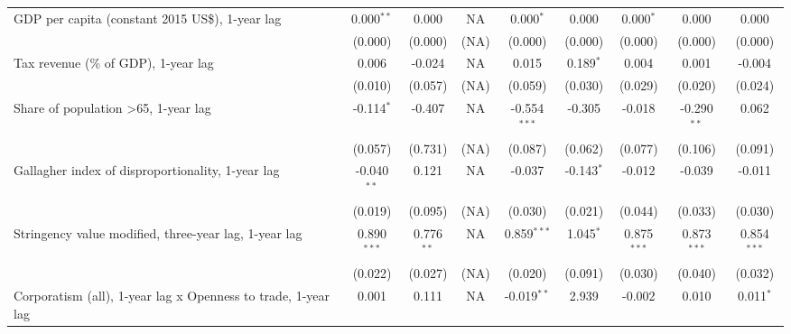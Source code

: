 \begin{table}[htbp]
\begin{tabular}{lcccccccc}
      GDP per capita (constant 2015 US\$), 1-year lag               & 0.000$^{**}$  & 0.000                     & NA           & 0.000$^{*}$    & 0.000            & 0.000$^{*}$     & 0.000           & 0.000\\   
                                                                    & (0.000)       & (0.000)                   & (NA)         & (0.000)        & (0.000)          & (0.000)         & (0.000)         & (0.000)\\   
      Tax revenue (\% of GDP), 1-year lag                           & 0.006         & -0.024                    & NA           & 0.015          & 0.189$^{*}$      & 0.004           & 0.001           & -0.004\\   
                                                                    & (0.010)       & (0.057)                   & (NA)         & (0.059)        & (0.030)          & (0.029)         & (0.020)         & (0.024)\\   
      Share of population >65, 1-year lag                           & -0.114$^{*}$  & -0.407                    & NA           & -0.554$^{***}$ & -0.305           & -0.018          & -0.290$^{**}$   & 0.062\\   
                                                                    & (0.057)       & (0.731)                   & (NA)         & (0.087)        & (0.062)          & (0.077)         & (0.106)         & (0.091)\\   
      Gallagher index of disproportionality, 1-year lag             & -0.040$^{**}$ & 0.121                     & NA           & -0.037         & -0.143$^{*}$     & -0.012          & -0.039          & -0.011\\   
                                                                    & (0.019)       & (0.095)                   & (NA)         & (0.030)        & (0.021)          & (0.044)         & (0.033)         & (0.030)\\   
      Stringency value modified, three-year lag, 1-year lag         & 0.890$^{***}$ & 0.776$^{**}$              & NA           & 0.859$^{***}$  & 1.045$^{*}$      & 0.875$^{***}$   & 0.873$^{***}$   & 0.854$^{***}$\\   
                                                                    & (0.022)       & (0.027)                   & (NA)         & (0.020)        & (0.091)          & (0.030)         & (0.040)         & (0.032)\\   
      Corporatism (all), 1-year lag x Openness to trade, 1-year lag & 0.001         & 0.111                     & NA           & -0.019$^{**}$  & 2.939            & -0.002          & 0.010           & 0.011$^{*}$\\   

\end{tabular}
\end{table}
